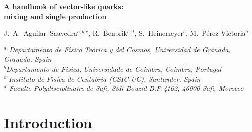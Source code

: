 \documentclass[12pt,a4paper]{article}
\begin{document}
\begin{center}
\begin{Large}
{\bf A handbook of vector-like quarks: \\[1mm]
mixing and single production}
\end{Large}

\vspace{0.5cm}
J.~A.~Aguilar--Saavedra$^{a,b,c}$, R.~Benbrik$^{c,d}$, S.~Heinemeyer$^c$, M.~P\'erez-Victoria$^a$\\[1mm]
\begin{small}
{\it $^a$ Departamento de F\'{\i}sica Te\'orica y del Cosmos, 
Universidad de Granada, Granada, Spain} \\
{\it $^b$Departamento de Fisica, Universidade de Coimbra,  Coimbra, Portugal} \\
{\it $^c$ Instituto de F\'{\i}sica de Cantabria (CSIC-UC), Santander, Spain} \\
{\it $^d$ Faculte Polydisciplinaire de Safi, Sidi Bouzid B.P 4162, 46000 Safi, Morocco}
\end{small}
\end{center}

\begin{abstract}
We obtain constraints on the mixing of vector-like quarks coupling predominantly to the third generation. We consider all (seven) relevant types of vector-like quarks, individually. The constraints are derived from oblique corrections and $Z \to b \bar b$ measurements at LEP and SLC. We investigate the implications of these constraints on LHC phenomenology, concerning the decays of the heavy quarks and their single production. We also explore indirect effects of heavy quark mixing in top and bottom couplings. A remarkable effect is the possibility of explaining the anomalous forward-backward asymmetry in $Z \to b \bar b$ at LEP with a hypercharge $-5/6$ doublet. We also study the impact of the new quarks on single Higgs production at the LHC and Higgs decay.
\end{abstract}
\section{Introduction}
\end{document}
